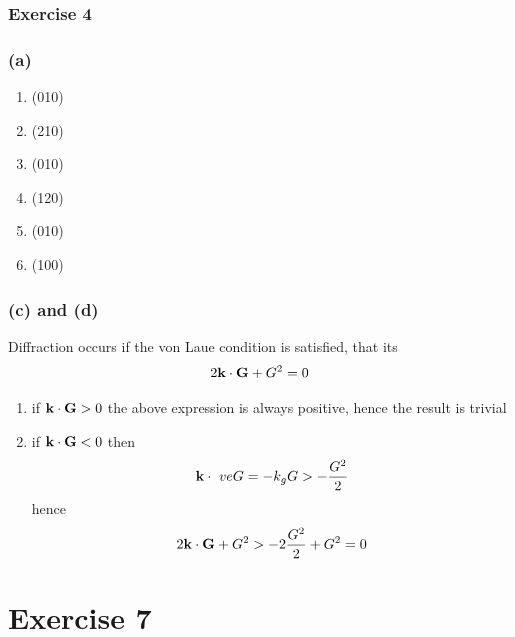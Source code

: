\subsubsection*{Exercise 4}

\subsubsection*{(a)}
\begin{enumerate}
    \item (010)
    \item (210)
    \item (010)
    \item (120)
    \item (010)
    \item (100)
\end{enumerate}

\subsubsection*{(c) and (d)}
Diffraction occurs if the von Laue condition is satisfied, that its
$$2 \mathbf{k} \cdot \mathbf{G} + G^2 = 0$$
\begin{enumerate}
    \item if $\mathbf{k} \cdot \mathbf{G} > 0$ the above expression is always positive, hence the result is trivial
    \item if $\mathbf{k} \cdot \mathbf{G} < 0$ then 
        $$ \mathbf{k} \cdot \ ve G = - k_g G > - \frac{G^2}{2}$$
        hence
        $$2 \mathbf{k} \cdot \mathbf{G} + G^2 > -2 \frac{G^2}{2} + G^2 = 0$$

\end{enumerate}


\section*{Exercise 7}

